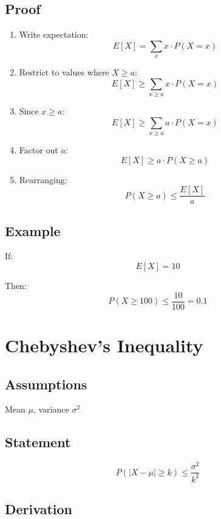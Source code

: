 \documentclass[12pt]{article}
\begin{document}
\subsection{Proof}

\begin{enumerate}
    \item Write expectation:
    \[
    E[X] = \sum_x x \cdot P(X = x)
    \]
    
    \item Restrict to values where $X \ge a$:
    \[
    E[X] \ge \sum_{x \ge a} x \cdot P(X = x)
    \]
    
    \item Since $x \ge a$:
    \[
    E[X] \ge \sum_{x \ge a} a \cdot P(X = x)
    \]
    
    \item Factor out $a$:
    \[
    E[X] \ge a \cdot P(X \ge a)
    \]
    
    \item Rearranging:
    \[
    P(X \ge a) \le \frac{E[X]}{a}
    \]
\end{enumerate}

\subsection{Example}

If:
\[
E[X] = 10
\]

Then:
\[
P(X \ge 100) \le \frac{10}{100} = 0.1
\]

\section{Chebyshev's Inequality}

\subsection{Assumptions}

Mean $\mu$, variance $\sigma^2$

\subsection{Statement}

\[
P(|X - \mu| \ge k) \le \frac{\sigma^2}{k^2}
\]

\subsection{Derivation}
\end{document}
